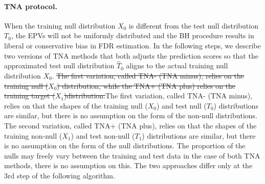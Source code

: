 \documentclass{article}
\newcommand{\correction}[2]{{\color{red}\sout{#1}}{\color{red}#2}}
\begin{document}
\paragraph{TNA protocol.} When the training null distribution $X_0$ is different from the test null distribution $T_0$, the EPVs will not be uniformly distributed and the BH procedure results in liberal or conservative bias in FDR estimation. In the following steps, we describe two versions of TNA methods that both adjusts the prediction scores so that the approximated test null distribution $\hat{T}_0$ aligns to the actual training null distribution $X_0$. \correction{The first variation, called TNA- (TNA minus), relies on the training null ($X_0$) distribution, while the TNA+ (TNA plus) relies on the training target ($X_1$)distribution.}{The first variation, called TNA- (TNA minus), relies on that the shapes of the training null ($X_0$) and test null ($T_0$) distributions are similar, but there is no assumption on the form of the non-null distributions. The second variation, called TNA+ (TNA plus), relies on that the shapes of the training non-null ($X_1$) and test non-null ($T_1$) distributions are similar, but there is no assumption on the form of the null distributions. The proportion of the nulls may freely vary between the training and test data in the case of both TNA methods, there is no assumption on this.} The two approaches differ only at the 3rd step of the following algorithm. 
\end{document}
